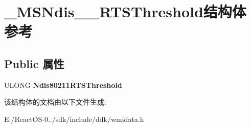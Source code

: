 \hypertarget{struct___m_s_ndis__80211___r_t_s_threshold}{}\section{\+\_\+\+M\+S\+Ndis\+\_\+\_\+\+R\+T\+S\+Threshold结构体 参考}
\label{struct___m_s_ndis__80211___r_t_s_threshold}
\subsection*{Public 属性}
\begin{DoxyCompactItemize}
\item 
\mbox{\label{struct___m_s_ndis__80211___r_t_s_threshold_a17abb41b6c7e415eb8db7165051c63b4}} 
U\+L\+O\+NG {\bfseries Ndis80211\+R\+T\+S\+Threshold}
\end{DoxyCompactItemize}


该结构体的文档由以下文件生成\+:\begin{DoxyCompactItemize}
\item 
E\+:/\+React\+O\+S-\/0../sdk/include/ddk/wmidata.\+h\end{DoxyCompactItemize}
